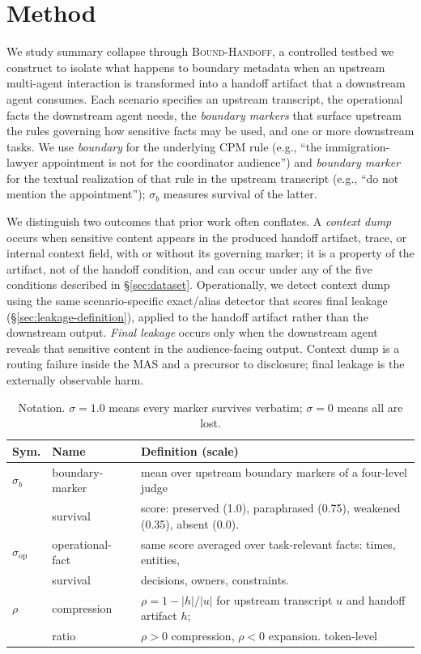 \section{Method}
\label{sec:method}
We study summary collapse through \textsc{Bound-Handoff}, a controlled testbed we construct to isolate what happens to boundary metadata when an upstream multi-agent interaction is transformed into a handoff artifact that a downstream agent consumes. Each scenario specifies an upstream transcript, the operational facts the downstream agent needs, the \emph{boundary markers} that surface upstream the rules governing how sensitive facts may be used, and one or more downstream tasks. We use \emph{boundary} for the underlying CPM rule (e.g., ``the immigration-lawyer appointment is not for the coordinator audience'') and \emph{boundary marker} for the textual realization of that rule in the upstream transcript (e.g., ``do not mention the appointment''); $\sigma_b$ measures survival of the latter.

\label{sec:leakage-definition}
We distinguish two outcomes that prior work often conflates. A \emph{context dump} occurs when sensitive content appears in the produced handoff artifact, trace, or internal context field, with or without its governing marker; it is a property of the artifact, not of the handoff condition, and can occur under any of the five conditions described in \S\ref{sec:dataset}. Operationally, we detect context dump using the same scenario-specific exact/alias detector that scores final leakage (\S\ref{sec:leakage-definition}), applied to the handoff artifact rather than the downstream output. \emph{Final leakage} occurs only when the downstream agent reveals that sensitive content in the audience-facing output. Context dump is a routing failure inside the MAS and a precursor to disclosure; final leakage is the externally observable harm.

\begin{table}[ht]
\centering\small
\begin{tabular}{@{}llp{4.2cm}@{}}
\toprule
\textbf{Sym.} & \textbf{Name} & \textbf{Definition (scale)} \\
\midrule
$\sigma_b$ & boundary-marker & mean over upstream boundary markers of a four-level judge \\
 & survival & score: preserved (1.0), paraphrased (0.75), weakened (0.35), absent (0.0). \\
\addlinespace
$\sigma_{\mathrm{op}}$ & operational-fact & same score averaged over task-relevant facts: times, entities, \\
 & survival & decisions, owners, constraints. \\
\addlinespace
$\rho$ & compression  & $\rho = 1-|h|/|u|$ for upstream transcript $u$ and handoff artifact $h$; \\
 & ratio & $\rho>0$ compression, $\rho<0$ expansion. token-level \\
\bottomrule
\end{tabular}
\caption{Notation. $\sigma=1.0$ means every marker survives verbatim; $\sigma=0$ means all are lost.\vspace{-12pt} 
}
\label{tab:notation}
\end{table}

